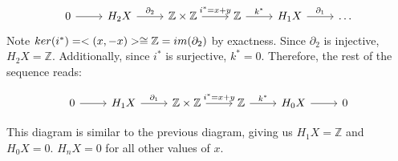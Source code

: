 \begin{example}
\[\begin{tikzcd}
0 \arrow[r] & H_2 X \arrow[r, "\partial_2"] & \mathbb{Z}\times \mathbb{Z} \arrow[r, "i^*=x+y"] & \mathbb{Z} \arrow[r, "k^*"] & H_1X \arrow[r, "\partial_1"] & \dots
\end{tikzcd}\]
Note $ker(i^*)=<(x,-x)>\cong \mathbb{Z}=im(\partial_2)$ by exactness. Since $\partial_2$ is injective, $H_2 X= \mathbb{Z}$. Additionally, since $i^*$ is surjective, $k^*=0$. Therefore, the rest of the sequence reads:

\[\begin{tikzcd}
0 \arrow[r] & H_1 X \arrow[r, "\partial_1"] & \mathbb{Z}\times \mathbb{Z} \arrow[r, "i^*=x+y"] & \mathbb{Z} \arrow[r, "k^*"] & H_0X \arrow[r] & 0
\end{tikzcd}\]

This diagram is similar to the previous diagram, giving us $H_1 X=\mathbb{Z}$ and $H_0 X= 0$. $H_nX =0$ for all other values of $x$.
\end{example}